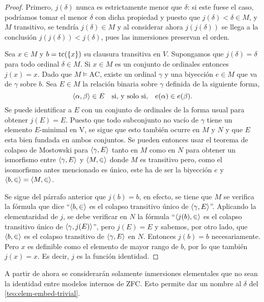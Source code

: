 \begin{proof}
    Primero, $j(\delta)$ nunca es estrictamente menor que $\delta$:
    si este fuese el caso, podríamos tomar el menor $\delta$ con dicha propiedad
    y puesto que $j(\delta) < \delta \in M$, y $M$ transitivo, se tendría
    $j(\delta)\in M$ y al considerar ahora $j(j(\delta))$ se llega a la conclusión
    $j(j(\delta)) < j(\delta)$, pues las inmersiones preservan el orden.

    Sea $x\in M$ y $b = \operatorname{tc}(\left\{ x \right\})$ su clausura transitiva en $V$.
    Supongamos que $j(\delta) = \delta$ para todo ordinal $\delta\in M$.
    Si $x\in M$ es un conjunto de ordinales entonces $j(x)=x$.
    Dado que $M\models \text{AC}$, existe un ordinal $\gamma$ y
    una biyección $e\in M$ que va de $\gamma$ sobre $b$.
    Sea $E\in M$ la relación binaria sobre $\gamma$ definida de la siguiente forma,
    \[
        \langle \alpha, \beta \rangle\in E\quad\text{si, y solo si,}\quad e(\alpha)\in e(\beta).
    \]
    Se puede identificar a $E$ con un conjunto de ordinales de la forma usual
    para obtener $j(E)=E$. Puesto que todo subconjunto no vacío de $\gamma$
    tiene un elemento $E$-minimal en V, se sigue que esto también ocurre en $M$ y $N$
    y que $E$ esta bien fundada en ambos conjuntos.
    Se pueden entonces usar el teorema de colapso de Mostowski para $\langle \gamma, E \rangle$
    tanto en $M$ como en $N$ para obtener un ismorfismo entre $\langle \gamma, E \rangle$
    y $\langle M,\in \rangle$ donde $M$ es transitivo pero, como el isomorfismo antes mencionado
    es único, este ha de ser la biyección $e$ y $\langle b,\in \rangle = \langle M,\in \rangle$.

    Se sigue del párrafo anterior que $j(b)=b$, en efecto,
    se tiene que $M$ se verifica la fórmula
    que dice ``$\langle b,\in \rangle$ es el colapso transitivo único de $\langle \gamma, E \rangle$''.
    Aplicando la elementaridad de $j$, se debe verificar en $N$ la fórmula
    ``$\langle j(b),\in \rangle$ es el colapso transitivo único de $\langle \gamma, j(E) \rangle$'',
    pero $j(E)=E$ y sabemos, por otro lado, que $\langle b,\in \rangle$ es el colapso transitivo
    de  $\langle \gamma, E \rangle$ en $N$. Entonces $j(b)=b$ necesariamente.
    Pero $x$ es definible como el elemento de mayor rango de $b$, por lo que también
    $j(x) = x$. Es decir, $j$ es la función identidad.
\end{proof}

A partir de ahora
se considerarán solamente inmersiones elementales que no sean la identidad
entre modelos internos de ZFC.
Esto permite dar un nombre al $\delta$ del \cref{teo:elem-embed-trivial}.

